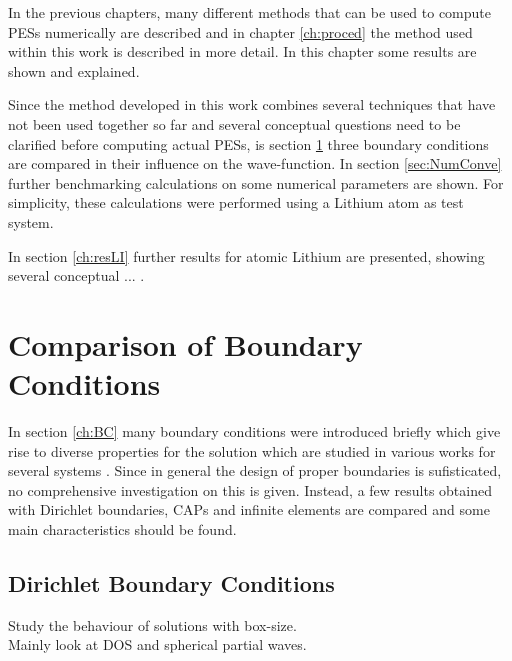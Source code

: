 In the previous chapters, many different methods that can be used to compute PESs numerically are described and in chapter \ref{ch:proced} the method used within this work is described in more detail.
In this chapter some results are shown and explained.

Since the method developed in this work combines several techniques that have not been used together so far and several conceptual questions need to be clarified before computing actual PESs, is section \ref{ch:BCbench} three boundary conditions are compared in their influence on the wave-function. In section \ref{sec:NumConve} further benchmarking calculations on some numerical parameters are shown.
For simplicity, these calculations were performed using a Lithium atom as test system.

In section \ref{ch:resLI} further results for atomic Lithium are presented, showing several conceptual ... .


\section{Comparison of Boundary Conditions}
\label{ch:BCbench}
In section \ref{ch:BC} many boundary conditions were introduced briefly which give rise to diverse properties for the solution which are studied in various works for several systems \cite{babuska}.
Since in general the design of proper boundaries is sufisticated, no comprehensive investigation on this is given.
Instead, a few results obtained with Dirichlet boundaries, CAPs and infinite elements are compared and some main characteristics should be found.

\subsection{Dirichlet Boundary Conditions}
Study the behaviour of solutions with box-size.\\
Mainly look at DOS and spherical partial waves.

